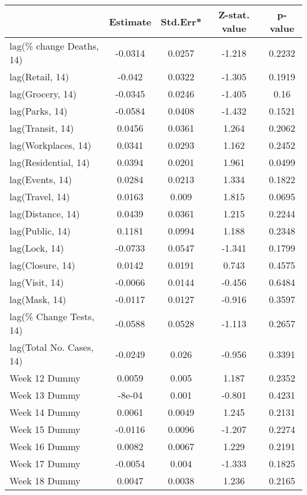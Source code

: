\begingroup\tiny
\begin{longtable}{lcccc}
  \toprule
 & Estimate & Std.Err* & Z-stat. value & p-value \\ 
  \midrule
lag(\% change Deaths, 14) & -0.0314 & 0.0257 & -1.218 & 0.2232 \\ 
  lag(Retail, 14) & -0.042 & 0.0322 & -1.305 & 0.1919 \\ 
  lag(Grocery, 14) & -0.0345 & 0.0246 & -1.405 & 0.16 \\ 
  lag(Parks, 14) & -0.0584 & 0.0408 & -1.432 & 0.1521 \\ 
  lag(Transit, 14) & 0.0456 & 0.0361 & 1.264 & 0.2062 \\ 
  lag(Workplaces, 14) & 0.0341 & 0.0293 & 1.162 & 0.2452 \\ 
  lag(Residential, 14) & 0.0394 & 0.0201 & 1.961 & 0.0499 \\ 
  lag(Events, 14) & 0.0284 & 0.0213 & 1.334 & 0.1822 \\ 
  lag(Travel, 14) & 0.0163 & 0.009 & 1.815 & 0.0695 \\ 
  lag(Distance, 14) & 0.0439 & 0.0361 & 1.215 & 0.2244 \\ 
  lag(Public, 14) & 0.1181 & 0.0994 & 1.188 & 0.2348 \\ 
  lag(Lock, 14) & -0.0733 & 0.0547 & -1.341 & 0.1799 \\ 
  lag(Closure, 14) & 0.0142 & 0.0191 & 0.743 & 0.4575 \\ 
  lag(Visit, 14) & -0.0066 & 0.0144 & -0.456 & 0.6484 \\ 
  lag(Mask, 14) & -0.0117 & 0.0127 & -0.916 & 0.3597 \\ 
  lag(\% Change Tests, 14) & -0.0588 & 0.0528 & -1.113 & 0.2657 \\ 
  lag(Total No. Cases, 14) & -0.0249 & 0.026 & -0.956 & 0.3391 \\ 
  Week 12 Dummy & 0.0059 & 0.005 & 1.187 & 0.2352 \\ 
  Week 13 Dummy & -8e-04 & 0.001 & -0.801 & 0.4231 \\ 
  Week 14 Dummy & 0.0061 & 0.0049 & 1.245 & 0.2131 \\ 
  Week 15 Dummy & -0.0116 & 0.0096 & -1.207 & 0.2274 \\ 
  Week 16 Dummy & 0.0082 & 0.0067 & 1.229 & 0.2191 \\ 
  Week 17 Dummy & -0.0054 & 0.004 & -1.333 & 0.1825 \\ 
  Week 18 Dummy & 0.0047 & 0.0038 & 1.236 & 0.2165 \\ 

\end{longtable}
